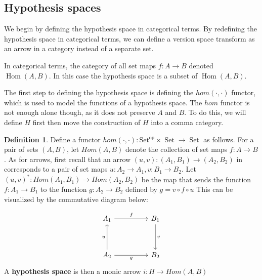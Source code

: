 \documentclass{article}
\theoremstyle{definition}
\newtheorem{definition}{Definition}[section]
\begin{document}
\subsection{Hypothesis spaces}
We begin by defining the hypothesis space in categorical terms. By redefining the hypothesis space in categorical terms, we can define a version space transform as an arrow in a category instead of a separate set. 

In categorical terms, the category of all set maps $f: A \rightarrow B$ denoted $\operatorname{Hom}(A,B)$. In this case the hypothesis space is a subset of $\operatorname{Hom}(A,B)$. 

The first step to defining the hypothesis space is defining the $hom(\cdot, \cdot)$ functor, which is used to model the functions of a hypothesis space. The $hom$ functor is not enough alone though, as it does not preserve $A$ and $B$. To do this, we will define $H$ first then move the construction of $H$ into a comma category.

\begin{definition}
Define a functor $hom(\cdot,\cdot): \operatorname{Set^{op}} \times \operatorname{Set} \rightarrow \operatorname{Set}$ as follows. For a pair of sets $(A,B)$, let $Hom(A,B)$ denote the collection of set maps $f:A\rightarrow B$. As for arrows, first recall that an arrow $(u,v):(A_1, B_1) \rightarrow (A_2, B_2)$ in corresponds to a pair of set maps $u: A_2 \rightarrow A_1, v:B_1\rightarrow B_2$. Let $(u,v)^*: Hom(A_1,B_1) \rightarrow Hom(A_2,B_2)$ be the map that sends the function $f:A_1\rightarrow B_1$ to the function $g: A_2 \rightarrow B_2$ defined by $g=v \circ f \circ u$ This can be visualized by the commutative diagram below: 

\[\begin{tikzcd}
	{A_1} && {B_1} \\
	\\
	{A_2} && {B_2}
	\arrow["f", from=1-1, to=1-3]
	\arrow["u", from=3-1, to=1-1]
	\arrow["g"', from=3-1, to=3-3]
	\arrow["v", from=1-3, to=3-3]
\end{tikzcd}\]
A \textbf{hypothesis space} is then a monic arrow $i:H\rightarrow Hom(A,B)$
\end{definition}
\end{document}
